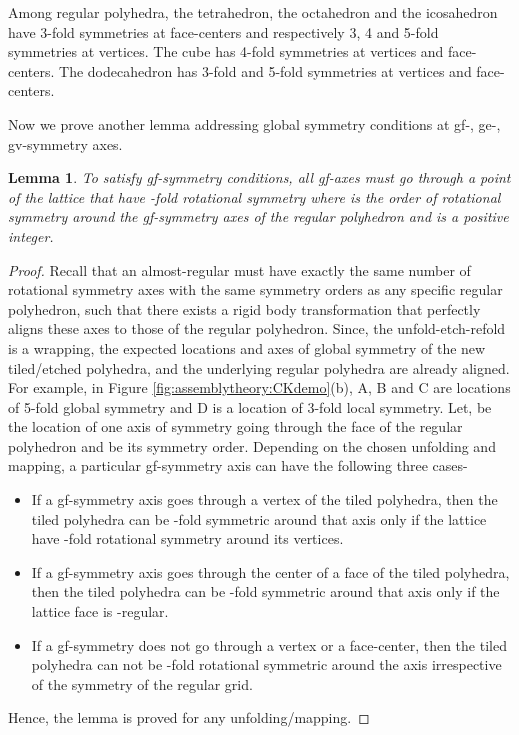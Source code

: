 \documentclass[11pt]{article}
\newtheorem{lemma}[thm]{Lemma}
\newcommand{\1}{\mathds{1}}
\begin{document}
Among regular polyhedra, the tetrahedron, the octahedron and the icosahedron have 3-fold symmetries at face-centers and respectively 3, 4 and 5-fold symmetries at vertices. The cube has 4-fold symmetries at vertices and face-centers. The dodecahedron has 3-fold and 5-fold symmetries at vertices and face-centers. 

Now we prove another lemma addressing global symmetry conditions at gf-, ge-, gv-symmetry axes.


\begin{lemma}
\label{lemma:assemblytheory:localglobal}
 To satisfy gf-symmetry conditions, all gf-axes must go through a point of the lattice that have -fold rotational symmetry where  is the order of rotational symmetry around the gf-symmetry axes of the regular polyhedron and  is a positive integer.
\end{lemma}

\begin{proof}
 Recall that an almost-regular must have exactly the same number of rotational symmetry axes with the same symmetry orders as any specific regular polyhedron, such that there exists a rigid body transformation that perfectly aligns these axes to those of the regular polyhedron. Since, the unfold-etch-refold is a wrapping, the expected locations and axes of global symmetry of the new tiled/etched polyhedra, and the underlying regular polyhedra are already aligned. For example, in Figure \ref{fig:assemblytheory:CKdemo}(b), A, B and C are locations of 5-fold global symmetry and D is a location of 3-fold local symmetry. Let,  be the location of one axis of symmetry going through the face of the regular polyhedron and  be its symmetry order. Depending on the chosen unfolding and mapping, a particular gf-symmetry axis can have the following three cases-

 \begin{itemize}
  \item If a gf-symmetry axis goes through a vertex of the tiled polyhedra, then the tiled polyhedra can be -fold symmetric around that axis only if the lattice have -fold rotational symmetry around its vertices.
  \item If a gf-symmetry axis goes through the center of a face of the tiled polyhedra, then the tiled polyhedra can be -fold symmetric around that axis only if the lattice face is -regular.
  \item If a gf-symmetry does not go through a vertex or a face-center, then the tiled polyhedra can not be -fold rotational symmetric around the axis irrespective of the symmetry of the regular grid. 
 \end{itemize}

 Hence, the lemma is proved for any unfolding/mapping.
\end{proof} 
\end{document}
